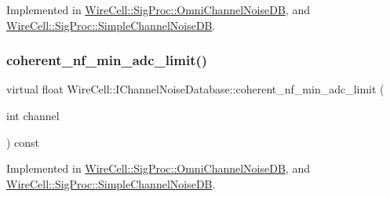 Implemented in \hyperlink{class_wire_cell_1_1_sig_proc_1_1_omni_channel_noise_d_b_a7c98e373e09268af35e18121d2a173f2}{Wire\+Cell\+::\+Sig\+Proc\+::\+Omni\+Channel\+Noise\+DB}, and \hyperlink{class_wire_cell_1_1_sig_proc_1_1_simple_channel_noise_d_b_a570a71f729172f7b19659f21d44b2e81}{Wire\+Cell\+::\+Sig\+Proc\+::\+Simple\+Channel\+Noise\+DB}.

\mbox{\label{class_wire_cell_1_1_i_channel_noise_database_a1668979331fd999d36d5cb5bb1ed00d6}} 
\subsubsection{\texorpdfstring{coherent\+\_\+nf\+\_\+min\+\_\+adc\+\_\+limit()}{coherent\_nf\_min\_adc\_limit()}}
{\footnotesize\ttfamily virtual float Wire\+Cell\+::\+I\+Channel\+Noise\+Database\+::coherent\+\_\+nf\+\_\+min\+\_\+adc\+\_\+limit (\begin{DoxyParamCaption}\item[{int}]{channel }\end{DoxyParamCaption}) const\hspace{0.3cm}{\ttfamily [pure virtual]}}



Implemented in \hyperlink{class_wire_cell_1_1_sig_proc_1_1_omni_channel_noise_d_b_a346695c1e101b6cbcfac60ae4c9f0ea3}{Wire\+Cell\+::\+Sig\+Proc\+::\+Omni\+Channel\+Noise\+DB}, and \hyperlink{class_wire_cell_1_1_sig_proc_1_1_simple_channel_noise_d_b_ab501b262245b5c052abd49fd0d67c803}{Wire\+Cell\+::\+Sig\+Proc\+::\+Simple\+Channel\+Noise\+DB}.

\mbox{\label{class_wire_cell_1_1_i_channel_noise_database_a4572de7acbdd4427cc4c409193abaae8}} 
